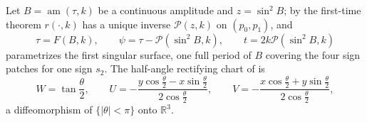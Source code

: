 \documentclass[11pt]{article}
\theoremstyle{remark}
\newcommand{\am}{\operatorname{am}}
\begin{document}
Let $B=\am(\tau,k)$ be a continuous amplitude and $z=\sin^2B$; by the
first-time theorem $r(\cdot,k)$ has a unique inverse $\mathcal P(z,k)$ on
$(p_0,p_1)$, and
\begin{equation}\label{eq:sheet-param}
 \tau=F(B,k),\qquad \psi=\tau-\mathcal P(\sin^2B,k),\qquad t=2k\mathcal P(\sin^2B,k)
\end{equation}
parametrizes the first singular surface, one full period of $B$ covering
the four sign patches for one sign $s_2$.  The half-angle rectifying chart
of \cite{MoiseevSachkov2010Maxwell} is
\begin{equation}\label{eq:half-angle}
 W=\tan\frac\theta2,\qquad
 U=-\frac{y\cos\frac\theta2-x\sin\frac\theta2}{2\cos\frac\theta2},\qquad
 V=-\frac{x\cos\frac\theta2+y\sin\frac\theta2}{2\cos\frac\theta2},
\end{equation}
a diffeomorphism of $\{|\theta|<\pi\}$ onto $\mathbb R^3$.
\end{document}
